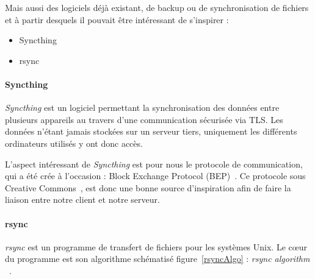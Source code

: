 \documentclass[a4paper,10pt, twoside]{report}
\begin{document}
\begin{spacing}{1.2}
Mais aussi des logiciels d\'ej\`a existant, de backup ou de synchronisation de
fichiers et \`a partir desquels il pouvait \^etre int\'eressant de s'inspirer :
\begin{itemize}
 \item Syncthing~\cite{refSyncthing}
 \item rsync~\cite{refRsync}
\end{itemize}

\paragraph{Syncthing}
\textit{Syncthing} est un logiciel permettant la synchronisation des donn\'ees
entre plusieurs appareils au travers d'une communication s\'ecuris\'ee via TLS.
Les donn\'ees n'\'etant jamais stock\'ees sur un serveur tiers, uniquement les
diff\'erents ordinateurs utilis\'es y ont donc acc\`es.

L'aspect int\'eressant de \textit{Syncthing} est pour nous le protocole de
communication, qui a \'et\'e cr\'ee \`a l'occasion : Block Exchange Protocol
(BEP)~\cite{refBEP}. Ce protocole sous Creative Commons~\cite{refCC4.0}, est
donc une bonne source d'inspiration afin de faire la liaison entre notre client
et notre serveur.

\paragraph{rsync}
\textit{rsync} est un programme de transfert de fichiers pour les syst\`emes
Unix. Le c\oe ur du programme est son algorithme sch\'ematis\'e
figure~\ref{rsyncAlgo} :
\textit{\flqq rsync algorithm \frqq}~\cite{refRsyncAlgo}.


\end{spacing}
\end{document}
